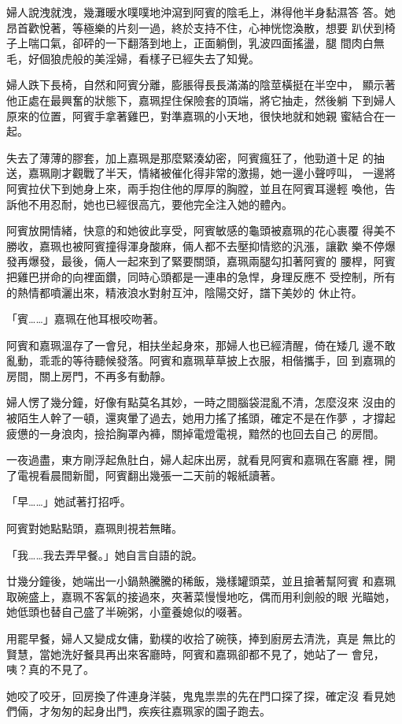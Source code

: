 婦人說洩就洩，幾灘暖水噗噗地沖瀉到阿賓的陰毛上，淋得他半身黏濕答
答。她昂首歡悅著，等極樂的片刻一過，終於支持不住，心神恍惚渙散，想要
趴伏到椅子上喘口氣，卻砰的一下翻落到地上，正面躺倒，乳波四面搖盪，腿
間肉白無毛，好個狼虎般的美淫婦，看樣子已經失去了知覺。

婦人跌下長椅，自然和阿賓分離，膨脹得長長滿滿的陰莖橫挺在半空中，
顯示著他正處在最興奮的狀態下，嘉珮捏住保險套的頂端，將它抽走，然後躺
下到婦人原來的位置，阿賓手拿著雞巴，對準嘉珮的小天地，很快地就和她親
蜜結合在一起。

失去了薄薄的膠套，加上嘉珮是那麼緊湊幼密，阿賓瘋狂了，他勁道十足
的抽送，嘉珮剛才觀戰了半天，情緒被催化得非常的激揚，她一邊小聲哼叫，
一邊將阿賓拉伏下到她身上來，兩手抱住他的厚厚的胸膛，並且在阿賓耳邊輕
喚他，告訴他不用忍耐，她也已經很高亢，要他完全注入她的體內。

阿賓放開情緒，快意的和她彼此享受，阿賓敏感的龜頭被嘉珮的花心裹覆
得美不勝收，嘉珮也被阿賓撞得渾身酸麻，倆人都不去壓抑情慾的汎漲，讓歡
樂不停爆發再爆發，最後，倆人一起來到了緊要關頭，嘉珮兩腿勾扣著阿賓的
腰桿，阿賓把雞巴拼命的向裡面鑽，同時心頭都是一連串的急悍，身理反應不
受控制，所有的熱情都噴灑出來，精液浪水對射互沖，陰陽交好，譜下美妙的
休止符。

「賓……」嘉珮在他耳根咬吻著。

阿賓和嘉珮溫存了一會兒，相扶坐起身來，那婦人也已經清醒，倚在矮几
邊不敢亂動，乖乖的等待聽候發落。阿賓和嘉珮草草披上衣服，相偕攜手，回
到嘉珮的房間，關上房門，不再多有動靜。

婦人愣了幾分鐘，好像有點莫名其妙，一時之間腦袋混亂不清，怎麼沒來
沒由的被陌生人幹了一頓，還爽暈了過去，她用力搖了搖頭，確定不是在作夢
，才撐起疲憊的一身浪肉，撿拾胸罩內褲，關掉電燈電視，黯然的也回去自己
的房間。

一夜過盡，東方剛浮起魚肚白，婦人起床出房，就看見阿賓和嘉珮在客廳
裡，開了電視看晨間新聞，阿賓翻出幾張一二天前的報紙讀著。

「早……」她試著打招呼。

阿賓對她點點頭，嘉珮則視若無睹。

「我……我去弄早餐。」她自言自語的說。

廿幾分鐘後，她端出一小鍋熱騰騰的稀飯，幾樣罐頭菜，並且搶著幫阿賓
和嘉珮取碗盛上，嘉珮不客氣的接過來，夾著菜慢慢地吃，偶而用利劍般的眼
光瞄她，她低頭也替自己盛了半碗粥，小童養媳似的啜著。

用罷早餐，婦人又變成女傭，勤樸的收拾了碗筷，捧到廚房去清洗，真是
無比的賢慧，當她洗好餐具再出來客廳時，阿賓和嘉珮卻都不見了，她站了一
會兒，咦？真的不見了。

她咬了咬牙，回房換了件連身洋裝，鬼鬼祟祟的先在門口探了探，確定沒
看見她們倆，才匆匆的起身出門，疾疾往嘉珮家的園子跑去。

